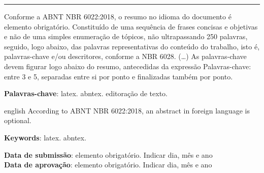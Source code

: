\maketitle

\noindent\rule{\textwidth}{1pt}

\begin{resumoumacoluna}
    Conforme a ABNT NBR 6022:2018, o resumo no idioma do documento é elemento obrigatório. Constituído de uma sequência de frases concisas e objetivas e não de uma simples enumeração de tópicos, não ultrapassando 250 palavras, seguido, logo abaixo, das palavras representativas do conteúdo do trabalho, isto é, palavras-chave e/ou descritores, conforme a NBR 6028. (\ldots) As palavras-chave devem figurar logo abaixo do resumo, antecedidas da expressão Palavras-chave: entre 3 e 5, separadas entre si por ponto e finalizadas também por ponto.
   
    \vspace{\onelineskip}
    
    \noindent
    \textbf{Palavras-chave}: latex. abntex. editoração de texto.
\end{resumoumacoluna}


\renewcommand{\resumoname}{Abstract}
\begin{resumoumacoluna}
\begin{otherlanguage*}{english}
    According to ABNT NBR 6022:2018, an abstract in foreign language is optional.

    \vspace{\onelineskip}

    \noindent
    \textbf{Keywords}: latex. abntex.
\end{otherlanguage*}  
\end{resumoumacoluna}


\begin{center}\smaller
    \textbf{Data de submissão}: elemento obrigatório. Indicar dia, mês e ano \\
    \textbf{Data de aprovação}: elemento obrigatório. Indicar dia, mês e ano
\end{center}